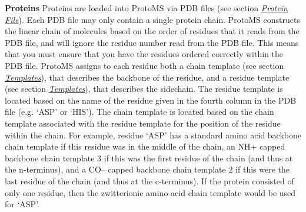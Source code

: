 \documentclass[letterpaper,10pt,english]{sphinxmanual}
\begin{document}
\textbf{Proteins}
Proteins are loaded into ProtoMS via PDB files (see section {\hyperref[protoms:protpdb]{\emph{Protein File}}}). Each PDB file may only contain a single protein chain. ProtoMS constructs the linear chain of molecules based on the order of residues that it reads from the PDB file, and will ignore the residue number read from the PDB file. This means that you must ensure that you have the residues ordered correctly within the PDB file. ProtoMS assigns to each residue both a chain template (see section {\hyperref[protoms:temref]{\emph{Templates}}}), that describes the backbone of the residue, and a residue template (see section {\hyperref[protoms:temref]{\emph{Templates}}}), that describes the sidechain. The residue template is located based on the name of the residue given in the fourth column in the PDB file (e.g. ‘ASP’ or ‘HIS’). The chain template is located based on the chain template associated with the residue template for the position of the residue within the chain. For example, residue ‘ASP’ has a standard amino acid backbone chain template if this residue was in the middle of the chain, an NH+ capped backbone chain template 3 if this was the first residue of the chain (and thus at the n-terminus), and a CO-- capped backbone chain template 2 if this were the last residue of the chain (and thus at the c-terminus). If the protein consisted of only one residue, then the zwitterionic amino acid chain template would be used for ‘ASP’.
\end{document}
